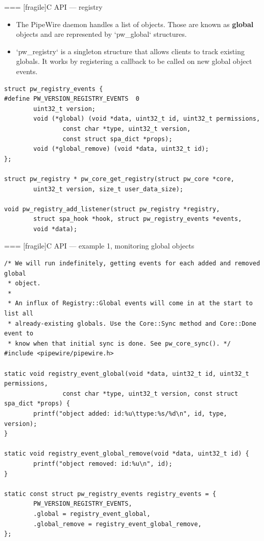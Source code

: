 === [fragile]{C API — registry}
  \begin{itemize}

  \item The PipeWire daemon handles a list of objects. Those are
    known as \textbf{global} objects and are represented by
    `pw_global` structures.

  \item `pw_registry` is a singleton structure that allows clients
    to track existing globals. It works by registering a callback to be
    called on new global object events.

  \end{itemize}

      \begin{block}{}
        \fontsize{9}{9}\selectfont
          \begin{verbatim}
struct pw_registry_events {
#define PW_VERSION_REGISTRY_EVENTS  0
        uint32_t version;
        void (*global) (void *data, uint32_t id, uint32_t permissions,
                const char *type, uint32_t version,
                const struct spa_dict *props);
        void (*global_remove) (void *data, uint32_t id);
};

struct pw_registry * pw_core_get_registry(struct pw_core *core,
        uint32_t version, size_t user_data_size);

void pw_registry_add_listener(struct pw_registry *registry,
        struct spa_hook *hook, struct pw_registry_events *events,
        void *data);
          \end{verbatim}
      \end{block}




=== [fragile]{C API — example 1, monitoring global objects}
  \begin{block}{}
    \fontsize{8}{8}\selectfont
      \begin{verbatim}
/* We will run indefinitely, getting events for each added and removed global
 * object.
 *
 * An influx of Registry::Global events will come in at the start to list all
 * already-existing globals. Use the Core::Sync method and Core::Done event to
 * know when that initial sync is done. See pw_core_sync(). */
#include <pipewire/pipewire.h>

static void registry_event_global(void *data, uint32_t id, uint32_t permissions,
                const char *type, uint32_t version, const struct spa_dict *props) {
        printf("object added: id:%u\ttype:%s/%d\n", id, type, version);
}

static void registry_event_global_remove(void *data, uint32_t id) {
        printf("object removed: id:%u\n", id);
}

static const struct pw_registry_events registry_events = {
        PW_VERSION_REGISTRY_EVENTS,
        .global = registry_event_global,
        .global_remove = registry_event_global_remove,
};
    \end{verbatim}
  \end{block}




